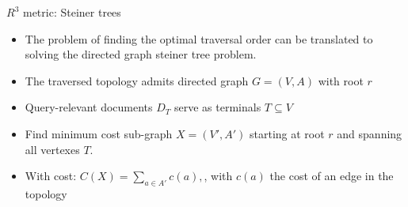 
\begin{frame}{$R^{3}$ metric: Steiner trees}
    \begin{itemize}
        \item The problem of finding the optimal traversal order can be translated to solving the directed graph steiner tree problem.
        \item The traversed topology admits directed graph $G = (V, A)$ with root $r$
        \item Query-relevant documents $D_{T}$ serve as terminals $T \subseteq V$
        \item Find minimum cost sub-graph $X = (V', A')$ starting at root $r$ and spanning all vertexes $T$.
        \item With cost: $ C(X) = \sum\nolimits_{a \in A'} c(a), $, with $c(a)$ the cost of an edge in the topology
    \end{itemize}
\end{frame}

